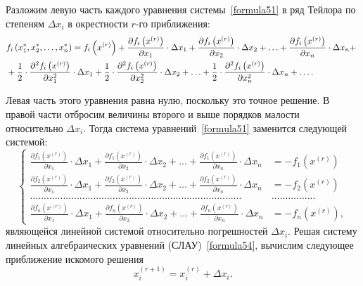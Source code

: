 Разложим левую часть каждого уравнения системы~\eqref{formula51} в ряд Тейлора по степеням $\Delta x_i$ в окрестности $r$-го приближения:
\begin{align}
\label{formula53}
&f_i\left(x_1^{*},x_2^{*},\dots,x_n^{*}\right)=f_i\left(x^{(r)}\right)+\frac{\partial f_i\left(x^{(r)}\right)}{\partial x_1}\cdot \Delta x_1+\frac{\partial f_i\left(x^{(r)}\right)}{\partial x_2}\cdot \Delta x_2+\dots+ \frac{\partial f_i\left(x^{(r)}\right)}{\partial x_n}\cdot \Delta x_n + \notag ~\\
&+\frac 1 2 \cdot \frac{\partial^2 f_i\left(x^{(r)}\right)}{\partial x_1^2} \cdot \Delta x_1 + \frac 1 2 \cdot \frac{\partial^2 f_i\left(x^{(r)}\right)}{\partial x_2^2} \cdot \Delta x_2 + \dots + \frac 1 2 \cdot \frac{\partial^2 f_i\left(x^{(r)}\right)}{\partial x_n^2} \cdot \Delta x_n + \dots.
\end{align}

Левая часть этого уравнения равна нулю, поскольку это точное решение. В правой части отбросим величины второго и выше порядков малости относительно $\Delta x_i$. Тогда система уравнений~\eqref{formula51} заменится следующей системой:
\begin{equation}
\label{formula54}
\left\{
\begin{aligned}
\frac{\partial f_1\left(x^{(r)}\right)}{\partial x_1}\cdot \Delta x_1+\frac{\partial f_1\left(x^{(r)}\right)}{\partial x_2}\cdot \Delta x_2+\dots+ \frac{\partial f_1\left(x^{(r)}\right)}{\partial x_n}\cdot \Delta x_n & = -f_1\left(x^{(r)}\right) \\
\frac{\partial f_2\left(x^{(r)}\right)}{\partial x_1}\cdot \Delta x_1+\frac{\partial f_2\left(x^{(r)}\right)}{\partial x_2}\cdot \Delta x_2+\dots+ \frac{\partial f_2\left(x^{(r)}\right)}{\partial x_n}\cdot \Delta x_n & = -f_2\left(x^{(r)}\right) \\
............................................................................. & ................ \\
\frac{\partial f_n\left(x^{(r)}\right)}{\partial x_1}\cdot \Delta x_1+\frac{\partial f_n\left(x^{(r)}\right)}{\partial x_2}\cdot \Delta x_2+\dots+ \frac{\partial f_n\left(x^{(r)}\right)}{\partial x_n}\cdot \Delta x_n & = -f_n\left(x^{(r)}\right),
\end{aligned}
\right.
\end{equation}
являющейся линейной системой относительно погрешностей $\Delta x_i$. Решая систему линейных алгебраических уравнений (СЛАУ)~\eqref{formula54}, вычислим следующее приближение искомого решения
\begin{equation}
\label{formula55}
x_i^{(r+1)}=x_i^{(r)}+\Delta x_i.
\end{equation} 

